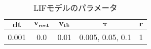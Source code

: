 \begin{table}[htb]
    \centering
    \caption{LIFモデルのパラメータ}
    \label{tab:model:parameter:lif}
    \begin{tabular}{ccccc}
        \hline
        $\bm{dt}$& $\bm{v_{rest}}$ & $\bm{v_{th}}$ & $\bm{\tau}$ & $\bm{r}$\\
        \hline
        0.001   & 0.0 & 0.01 & 0.005, 0.05, 0.1 & 1 \\
        \hline
    \end{tabular}
\end{table}